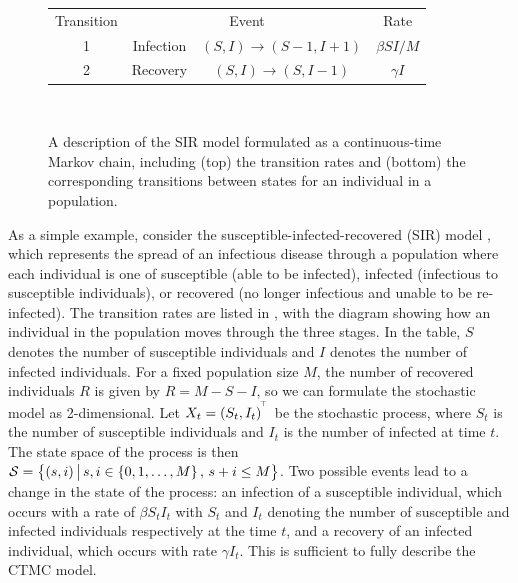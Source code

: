 \usetikzlibrary{automata,positioning,arrows}
\tikzset{->, node distance = 2cm}
\begin{figure}
	\centering
	\begin{tabular}{|c|c|c|c|}
		\hline
		Transition & \multicolumn{2}{c|}{Event} & Rate                                                                  \\ \hhline{|=|=|=|=|}
		1          & Infection                  & \(\left(S, I\right) \to \left(S-1, I + 1\right)\) & \(\beta S I / M\) \\ \hline
		2          & Recovery                   & \(\left(S,I\right) \to \left(S, I - 1\right)\)    & \(\gamma I\)      \\ \hline
	\end{tabular} \\
	\vspace{2mm}
	\caption{A description of the SIR model formulated as a continuous-time Markov chain, including (top) the transition rates and (bottom) the corresponding transitions between states for an individual in a population.}
	\label{fig:sir_transition}
\end{figure}

As a simple example, consider the susceptible-infected-recovered (SIR) model \citep{Allen_2017_PrimerStochasticEpidemic}, which represents the spread of an infectious disease through a population where each individual is one of susceptible (able to be infected), infected (infectious to susceptible individuals), or recovered (no longer infectious and unable to be re-infected).
The transition rates are listed in , with the diagram showing how an individual in the population moves through the three stages.
In the table, \(S\) denotes the number of susceptible individuals and \(I\) denotes the number of infected individuals.
For a fixed population size \(M\), the number of recovered individuals \(R\) is given by \(R = M - S - I\), so we can formulate the stochastic model as 2-dimensional.
Let \(X_t = \left(S_t,I_t\right)^{^{\!\top}}\) be the stochastic process, where \(S_t\) is the number of susceptible individuals and \(I_t\) is the number of infected at time \(t\).
The state space of the process is then \(\mathcal{S} = \left\{(s,i)\,\middle|\,s,i\in\set{0,1,\dotsc,M}, \, s + i \leq M\right\}\).
Two possible events lead to a change in the state of the process: an infection of a susceptible individual, which occurs with a rate of \(\beta S_t I_t\) with \(S_t\) and \(I_t\) denoting the number of susceptible and infected individuals respectively at the time \(t\), and a recovery of an infected individual, which occurs with rate \(\gamma I_t\).
This is sufficient to fully describe the CTMC model.

